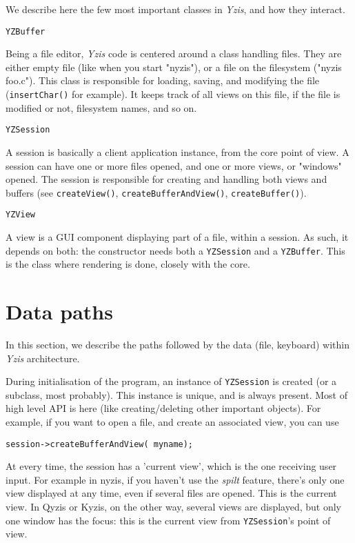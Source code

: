\documentclass[a4paper,12pt]{report}
\begin{document}
We describe here the few most important classes in \emph{Yzis}, and how
they interact.

\verb+YZBuffer+

Being a file editor, \emph{Yzis} code is centered around a class handling
files. They are either empty file (like when you start "nyzis"), or a file on
the filesystem ("nyzis foo.c").
This class is responsible for loading, saving, and modifying the file
(\verb+insertChar()+ for example). It keeps track of all views on this file,
if the file is modified or not, filesystem names, and so on.

\verb+YZSession+

A session is basically a client application instance, from the core point
of view. A session can have one or more files opened, and one or more views,
or "windows" opened. The session is responsible for creating and handling
both views and buffers (see \verb+createView()+, \verb+createBufferAndView()+,
\verb+createBuffer()+).

\verb+YZView+

A view is a GUI component displaying part of a file, within a session. As
such, it depends on both: the constructor needs both a
\verb+YZSession+ and a \verb+YZBuffer+. This is the class where rendering is
done, closely with the core.

\section{Data paths}
In this section, we describe the paths followed by the data (file,
keyboard) within \emph{Yzis} architecture.

During initialisation of the program, an instance of \verb+YZSession+ is
created (or a subclass, most probably). This instance is unique, and is
always present. Most of high level API is here (like creating/deleting other
important objects).
For example, if you want to open a file, and create an associated view, you
can use
\begin{verbatim}
session->createBufferAndView( myname);
\end{verbatim}

At every time, the session has a 'current view', which is the one receiving
user input. For example in nyzis, if you haven't use the \emph{spilt}
feature, there's only one view displayed at any time, even if several
files are opened.  This is the current view. In Qyzis or Kyzis, on the
other way, several views are displayed, but only one window has the focus:
this is the current view from \verb+YZSession+'s point of view.
\end{document}
